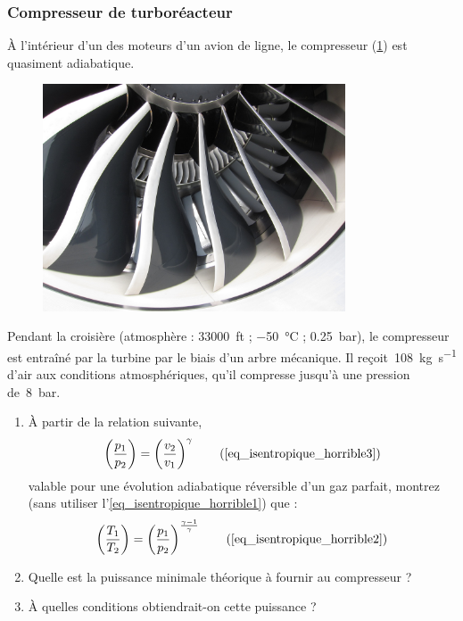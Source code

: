 \subsubsection{Compresseur de turboréacteur}
\label{exo_compresseur_turboreacteur}

	À l’intérieur d’un des moteurs d’un avion de ligne, le compresseur (\cref{fig_exo_entree_genx2b}) est quasiment adiabatique.	
	\begin{figure}[bh]
		\begin{center}
			\includegraphics[width=0.8\textwidth]{images/entree_genx2b.jpg}
		\end{center}
		\label{fig_exo_entree_genx2b}
	\end{figure}

	Pendant la croisière (atmosphère : \SI{33 000}{ft} ; \SI{-50}{\degreeCelsius} ; \SI{0,25}{\bar}), le compresseur est entraîné par la turbine par le biais d’un arbre mécanique. Il reçoit~\SI{108}{\kilogram\per\second} d’air aux conditions atmosphériques, qu’il compresse jusqu’à une pression de~\SI{8}{\bar}.
	
	\begin{enumerate}
		\item À partir de la relation suivante,
			\begin{equation}
				\left( \frac{p_1}{p_2} \right)	= \left( \frac{v_2}{v_1} \right)^{\gamma} \tag{\ref{eq_isentropique_horrible3}}
			\end{equation}
			valable pour une évolution adiabatique réversible d’un gaz parfait, montrez (sans utiliser l’\cref{eq_isentropique_horrible1}) que :			
			\begin{equation}
				\left( \frac{T_1}{T_2} \right)	=  \left( \frac{p_1}{p_2} \right)^{\frac{\gamma -1}{\gamma}}  \tag{\ref{eq_isentropique_horrible2}}
			\end{equation}
		\item Quelle est la puissance minimale théorique à fournir au compresseur ?
		\item À quelles conditions obtiendrait-on cette puissance ?
	\end{enumerate}
	
